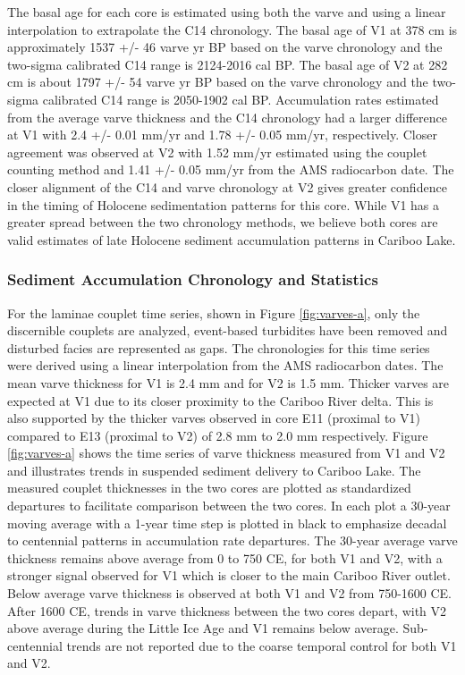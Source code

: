 \documentclass[Royal,times,doublespace,sageh]{sagej}
\begin{document}
The basal age for each core is estimated using both the varve and using
a linear interpolation to extrapolate the C14 chronology. The basal age
of V1 at 378 cm is approximately 1537 +/- 46 varve yr BP based on the
varve chronology and the two-sigma calibrated C14 range is 2124-2016 cal
BP. The basal age of V2 at 282 cm is about 1797 +/- 54 varve yr BP based
on the varve chronology and the two-sigma calibrated C14 range is
2050-1902 cal BP. Accumulation rates estimated from the average varve
thickness and the C14 chronology had a larger difference at V1 with 2.4
+/- 0.01 mm/yr and 1.78 +/- 0.05 mm/yr, respectively. Closer agreement
was observed at V2 with 1.52 mm/yr estimated using the couplet counting
method and 1.41 +/- 0.05 mm/yr from the AMS radiocarbon date. The closer
alignment of the C14 and varve chronology at V2 gives greater confidence
in the timing of Holocene sedimentation patterns for this core. While V1
has a greater spread between the two chronology methods, we believe both
cores are valid estimates of late Holocene sediment accumulation
patterns in Cariboo Lake.

\hypertarget{sediment-accumulation-chronology-and-statistics}{%
\subsubsection{Sediment Accumulation Chronology and
Statistics}\label{sediment-accumulation-chronology-and-statistics}}

For the laminae couplet time series, shown in Figure \ref{fig:varves-a},
only the discernible couplets are analyzed, event-based turbidites have
been removed and disturbed facies are represented as gaps. The
chronologies for this time series were derived using a linear
interpolation from the AMS radiocarbon dates. The mean varve thickness
for V1 is 2.4 mm and for V2 is 1.5 mm. Thicker varves are expected at V1
due to its closer proximity to the Cariboo River delta. This is also
supported by the thicker varves observed in core E11 (proximal to V1)
compared to E13 (proximal to V2) of 2.8 mm to 2.0 mm respectively.
Figure \ref{fig:varves-a} shows the time series of varve thickness
measured from V1 and V2 and illustrates trends in suspended sediment
delivery to Cariboo Lake. The measured couplet thicknesses in the two
cores are plotted as standardized departures to facilitate comparison
between the two cores. In each plot a 30-year moving average with a
1-year time step is plotted in black to emphasize decadal to centennial
patterns in accumulation rate departures. The 30-year average varve
thickness remains above average from 0 to 750 CE, for both V1 and V2,
with a stronger signal observed for V1 which is closer to the main
Cariboo River outlet. Below average varve thickness is observed at both
V1 and V2 from 750-1600 CE. After 1600 CE, trends in varve thickness
between the two cores depart, with V2 above average during the Little
Ice Age and V1 remains below average. Sub-centennial trends are not
reported due to the coarse temporal control for both V1 and V2.
\end{document}
